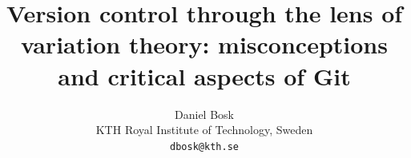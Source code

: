 \documentclass[a4paper,10pt,article,oneside,oldfontcommands]{memoir}
\title{%
  Version control through the lens of variation theory:
  misconceptions and critical aspects of Git%
}
\author{%
  Daniel Bosk
  \\KTH Royal Institute of Technology, Sweden
  \\\texttt{dbosk@kth.se}
}
\begin{document}
\maketitle
\begin{abstract}
  
\end{abstract}

\clearpage
\tableofcontents
\clearpage














\printbibliography

\appendix



\end{document}
